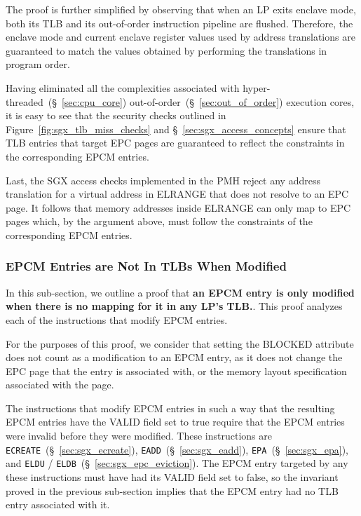 The proof is further simplified by observing that when an LP exits enclave
mode, both its TLB and its out-of-order instruction pipeline are flushed.
Therefore, the enclave mode and current enclave register values used by address
translations are guaranteed to match the values obtained by performing the
translations in program order.

Having eliminated all the complexities associated with
hyper-threaded~(\S~\ref{sec:cpu_core}) out-of-order~(\S~\ref{sec:out_of_order})
execution cores, it is easy to see that the security checks outlined in
Figure~\ref{fig:sgx_tlb_miss_checks} and \S~\ref{sec:sgx_access_concepts}
ensure that TLB entries that target EPC pages are guaranteed to reflect the
constraints in the corresponding EPCM entries.

Last, the SGX access checks implemented in the PMH reject any address
translation for a virtual address in ELRANGE that does not resolve to an EPC
page. It follows that memory addresses inside ELRANGE can only map to EPC
pages which, by the argument above, must follow the constraints of the
corresponding EPCM entries.


\subsubsection{EPCM Entries are Not In TLBs When Modified}

In this sub-section, we outline a proof that \textbf{an EPCM entry is only
modified when there is no mapping for it in any LP's TLB.}. This proof analyzes
each of the instructions that modify EPCM entries.

For the purposes of this proof, we consider that setting the BLOCKED attribute
does not count as a modification to an EPCM entry, as it does not change the
EPC page that the entry is associated with, or the memory layout specification
associated with the page.

The instructions that modify EPCM entries in such a way that the resulting EPCM
entries have the VALID field set to true require that the EPCM entries were
invalid before they were modified. These instructions are
\texttt{ECREATE}~(\S~\ref{sec:sgx_ecreate}),
\texttt{EADD}~(\S~\ref{sec:sgx_eadd}), \texttt{EPA}~(\S~\ref{sec:sgx_epa}),
and \texttt{ELDU} / \texttt{ELDB}~(\S~\ref{sec:sgx_epc_eviction}). The EPCM
entry targeted by any these instructions must have had its VALID field set to
false, so the invariant proved in the previous sub-section implies that the
EPCM entry had no TLB entry associated with it.

